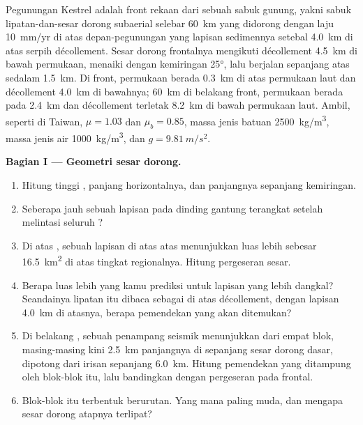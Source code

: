 \begin{problem}
\label{pb:b3:orogenic-wedges:1}
Pegunungan Kestrel adalah front rekaan dari sebuah sabuk gunung, yakni sabuk
lipatan-dan-sesar dorong subaerial selebar \qty{60}{km} yang didorong dengan laju \qty{10}{mm/yr} di atas
depan-pegunungan yang lapisan sedimennya setebal \qty{4.0}{km} di atas serpih
décollement. Sesar dorong frontalnya mengikuti décollement \qty{4.5}{km} di bawah
permukaan, menaiki  dengan kemiringan \ang{25}, lalu berjalan sepanjang  atas
sedalam \qty{1.5}{km}. Di front, permukaan berada \qty{0.3}{km} di atas
permukaan laut dan décollement \qty{4.0}{km} di bawahnya; \qty{60}{km} di belakang
front, permukaan berada pada \qty{2.4}{km} dan décollement terletak
\qty{8.2}{km} di bawah permukaan laut. Ambil, seperti di Taiwan, $\mu = 1.03$ dan $\mu_b =
0.85$, massa jenis batuan \qty{2500}{kg/m^3}, massa jenis air \qty{1000}{kg/m^3}, dan
$g = \qty{9.81}{m/s^2}$.

\medskip\noindent\textbf{Bagian I --- Geometri sesar dorong.}
\begin{enumerate}
  \item Hitung tinggi , panjang horizontalnya, dan panjangnya
        sepanjang kemiringan.
  \item Seberapa jauh sebuah lapisan pada dinding gantung terangkat setelah
        melintasi seluruh ?
  \item Di atas , sebuah lapisan di atas  atas menunjukkan luas lebih
        sebesar \qty{16.5}{km^2} di atas tingkat regionalnya. Hitung pergeseran sesar.
  \item Berapa luas lebih yang kamu prediksi untuk lapisan yang lebih dangkal? Seandainya
        lipatan itu dibaca sebagai  di atas décollement, dengan lapisan
        \qty{4.0}{km} di atasnya, berapa pemendekan yang akan ditemukan?
  \item Di belakang , sebuah penampang seismik menunjukkan  dari empat blok,
        masing-masing kini \qty{2.5}{km} panjangnya di sepanjang sesar dorong dasar, dipotong dari
        irisan sepanjang \qty{6.0}{km}. Hitung pemendekan yang ditampung oleh blok-blok itu, lalu
        bandingkan dengan pergeseran pada  frontal.
  \item Blok-blok itu terbentuk berurutan. Yang mana paling muda, dan mengapa sesar dorong
        atapnya terlipat?
\end{enumerate}


\end{problem}
